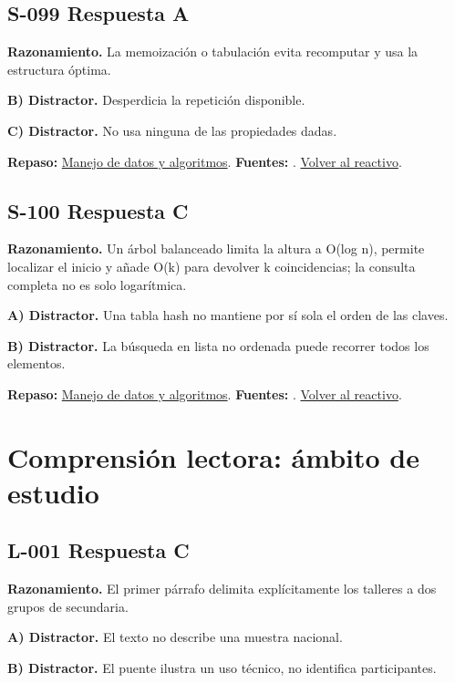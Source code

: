 \subsection*{S-099 \quad Respuesta A}\label{s:S-099}
\textbf{Razonamiento.} La memoización o tabulación evita recomputar y usa la estructura óptima.

\textbf{B) Distractor. }Desperdicia la repetición disponible.

\textbf{C) Distractor. }No usa ninguna de las propiedades dadas.

\textbf{Repaso:} \hyperref[sec:s3]{Manejo de datos y algoritmos}. \textbf{Fuentes:} \cite{algorithms,postgres,ai}. \hyperref[q:S-099]{Volver al reactivo}.\par\medskip

\subsection*{S-100 \quad Respuesta C}\label{s:S-100}
\textbf{Razonamiento.} Un árbol balanceado limita la altura a O(log n), permite localizar el inicio y añade O(k) para devolver k coincidencias; la consulta completa no es solo logarítmica.

\textbf{A) Distractor. }Una tabla hash no mantiene por sí sola el orden de las claves.

\textbf{B) Distractor. }La búsqueda en lista no ordenada puede recorrer todos los elementos.

\textbf{Repaso:} \hyperref[sec:s3]{Manejo de datos y algoritmos}. \textbf{Fuentes:} \cite{algorithms,postgres,ai}. \hyperref[q:S-100]{Volver al reactivo}.\par\medskip

\section{Comprensión lectora: ámbito de estudio}

\subsection*{L-001 \quad Respuesta C}\label{s:L-001}
\textbf{Razonamiento.} El primer párrafo delimita explícitamente los talleres a dos grupos de secundaria.

\textbf{A) Distractor. }El texto no describe una muestra nacional.

\textbf{B) Distractor. }El puente ilustra un uso técnico, no identifica participantes.

